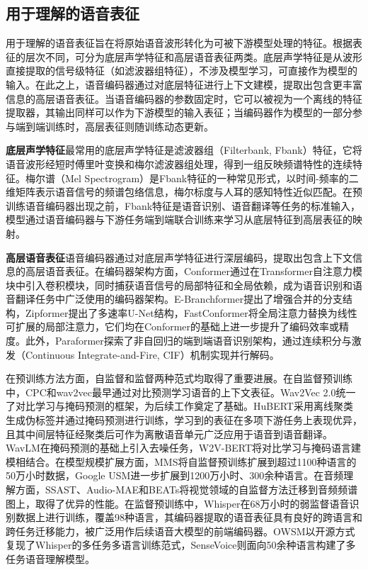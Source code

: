 \subsection{用于理解的语音表征}\label{sec:rw_repr_understand}

用于理解的语音表征旨在将原始语音波形转化为可被下游模型处理的特征。根据表征的层次不同，可分为底层声学特征和高层语音表征两类。底层声学特征是从波形直接提取的信号级特征（如滤波器组特征），不涉及模型学习，可直接作为模型的输入。在此之上，语音编码器通过对底层特征进行上下文建模，提取出包含更丰富信息的高层语音表征。当语音编码器的参数固定时，它可以被视为一个离线的特征提取器，其输出同样可以作为下游模型的输入表征；当编码器作为模型的一部分参与端到端训练时，高层表征则随训练动态更新。

\textbf{底层声学特征}\quad 最常用的底层声学特征是滤波器组（Filterbank, Fbank）特征，它将语音波形经短时傅里叶变换和梅尔滤波器组处理，得到一组反映频谱特性的连续特征。梅尔谱（Mel Spectrogram）是Fbank特征的一种常见形式，以时间-频率的二维矩阵表示语音信号的频谱包络信息，梅尔标度与人耳的感知特性近似匹配。在预训练语音编码器出现之前，Fbank特征是语音识别、语音翻译等任务的标准输入，模型通过语音编码器与下游任务端到端联合训练来学习从底层特征到高层表征的映射。

\textbf{高层语音表征}\quad 语音编码器通过对底层声学特征进行深层编码，提取出包含上下文信息的高层语音表征。在编码器架构方面，Conformer\citep{conformer}通过在Transformer自注意力模块中引入卷积模块，同时捕获语音信号的局部特征和全局依赖，成为语音识别和语音翻译任务中广泛使用的编码器架构。E-Branchformer\citep{kim2023ebranchformer}提出了增强合并的分支结构，Zipformer\citep{yao2024zipformer}提出了多速率U-Net结构，FastConformer\citep{rekesh2023fastconformer}将全局注意力替换为线性可扩展的局部注意力，它们均在Conformer的基础上进一步提升了编码效率或精度。此外，Paraformer\citep{gao2022paraformer}探索了非自回归的端到端语音识别架构，通过连续积分与激发（Continuous Integrate-and-Fire, CIF）\citep{dong2020cif}机制实现并行解码。

在预训练方法方面，自监督和监督两种范式均取得了重要进展。在自监督预训练中，CPC\citep{oord2018cpc}和wav2vec\citep{schneider2019wav2vec}最早通过对比预测学习语音的上下文表征。Wav2Vec 2.0\citep{baevski2020wav2vec}统一了对比学习与掩码预测的框架，为后续工作奠定了基础。HuBERT\citep{hubert}采用离线聚类生成伪标签并通过掩码预测进行训练，学习到的表征在多项下游任务上表现优异，且其中间层特征经聚类后可作为离散语音单元广泛应用于语音到语音翻译。WavLM\citep{chen2022wavlm}在掩码预测的基础上引入去噪任务，W2V-BERT\citep{chung2021w2vbert}将对比学习与掩码语言建模相结合。在模型规模扩展方面，MMS\citep{pratap2023mms}将自监督预训练扩展到超过1100种语言的50万小时数据，Google USM\citep{zhang2023usm}进一步扩展到1200万小时、300余种语言。在音频理解方面，SSAST\citep{gong2022ssast}、Audio-MAE\citep{huang2022audiomae}和BEATs\citep{chen2023beats}将视觉领域的自监督方法迁移到音频频谱图上，取得了优异的性能。在监督预训练中，Whisper\citep{whisper}在68万小时的弱监督语音识别数据上进行训练，覆盖98种语言，其编码器提取的语音表征具有良好的跨语言和跨任务迁移能力，被广泛用作后续语音大模型的前端编码器。OWSM\citep{peng2023owsm}以开源方式复现了Whisper的多任务多语言训练范式，SenseVoice\citep{an2024funaudiollm}则面向50余种语言构建了多任务语音理解模型。


